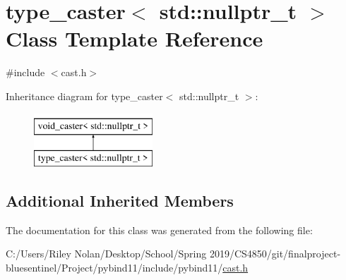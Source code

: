\hypertarget{classtype__caster_3_01std_1_1nullptr__t_01_4}{}\section{type\+\_\+caster$<$ std\+::nullptr\+\_\+t $>$ Class Template Reference}
\label{classtype__caster_3_01std_1_1nullptr__t_01_4}


{\ttfamily \#include $<$cast.\+h$>$}

Inheritance diagram for type\+\_\+caster$<$ std\+::nullptr\+\_\+t $>$\+:\begin{figure}[H]
\begin{center}
\leavevmode
\includegraphics[height=2.000000cm]{classtype__caster_3_01std_1_1nullptr__t_01_4}
\end{center}
\end{figure}
\subsection*{Additional Inherited Members}


The documentation for this class was generated from the following file\+:\begin{DoxyCompactItemize}
\item 
C\+:/\+Users/\+Riley Nolan/\+Desktop/\+School/\+Spring 2019/\+C\+S4850/git/finalproject-\/bluesentinel/\+Project/pybind11/include/pybind11/\mbox{\hyperlink{cast_8h}{cast.\+h}}\end{DoxyCompactItemize}
